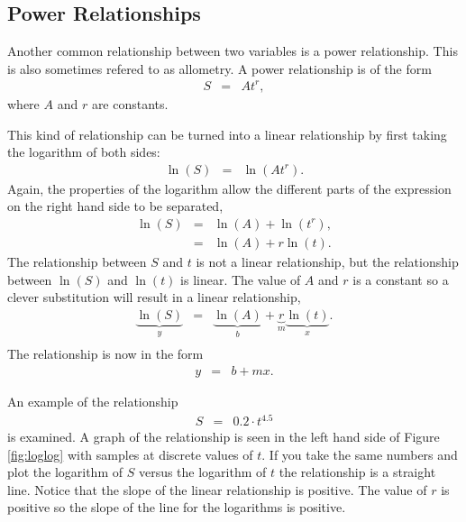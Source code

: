 \documentclass[12pt]{article}
\newcommand{\lp}{\left(}
\newcommand{\rp}{\right)}
\begin{document}
\subsection{Power Relationships}

Another common relationship between two variables is a power
relationship. This is also sometimes refered to as allometry. A power
relationship is of the form
\begin{eqnarray*}
  S & = & A t^{r},
\end{eqnarray*}
where $A$ and $r$ are constants.  

This kind of relationship can be turned into a linear relationship by
first taking the logarithm of both sides:
\begin{eqnarray*}
  \ln(S) & = & \ln\lp A t^r \rp.
\end{eqnarray*}
Again, the properties of the logarithm allow the different parts of
the expression on the right hand side to be separated,
\begin{eqnarray*}
\ln(S)  & = & \ln\lp A \rp + \ln\lp t^r \rp, \\
        & = & \ln\lp A\rp + r \ln\lp t \rp. 
\end{eqnarray*}
The relationship between $S$ and $t$ is not a linear relationship, but
the relationship between $\ln(S)$ and $\ln(t)$ is linear. The value of
$A$ and $r$ is a constant so a clever substitution will result in a
linear relationship,
\begin{eqnarray*}
  \underbrace{\ln(S)}_y
  & = & 
  \underbrace{\ln\lp A\rp}_b + 
  \underbrace{r}_m \underbrace{\ln\lp t \rp}_x. \\
\end{eqnarray*}
The relationship is now in the form
\begin{eqnarray*}
  y & = & b + mx.
\end{eqnarray*}

An example of the relationship
\begin{eqnarray*}
  S & = & 0.2 \cdot t^{4.5}
\end{eqnarray*}
is examined.  A graph of the relationship is seen in the left hand
side of Figure \ref{fig:loglog} with samples at discrete values of
$t$.  If you take the same numbers and plot the logarithm of $S$
versus the logarithm of $t$ the relationship is a straight line.
Notice that the slope of the linear relationship is positive.  The
value of $r$ is positive so the slope of the line for the logarithms
is positive.
\end{document}
